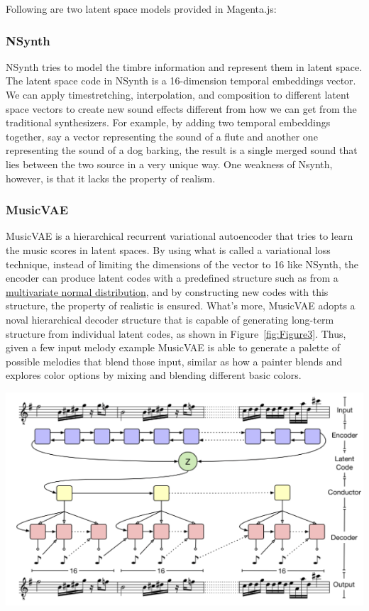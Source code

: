 \documentclass[man]{apa6}
\begin{document}
Following are two latent space models provided in Magenta.js:

\subsubsection{NSynth}
NSynth \parencite{engel2017neural} tries to model the timbre information and represent them in latent space. The latent space code in NSynth is a 16-dimension temporal embeddings vector. We can apply timestretching, interpolation, and composition to different latent space vectors to create new sound effects different from how we can get from the traditional synthesizers. For example, by adding two temporal embeddings together, say a vector representing the sound of a flute and another one representing the sound of a dog barking, the result is a single merged sound that lies between the two source in a very unique way. One weakness of Nsynth, however, is that it lacks the property of realism.

\subsubsection{MusicVAE}
MusicVAE \parencite{roberts2018hierarchical} is a hierarchical recurrent variational autoencoder that tries to learn the music scores in latent spaces. By using what is called a variational loss technique, instead of limiting the dimensions of the vector to 16 like NSynth, the encoder can produce latent codes with a predefined structure such as from a \href{https://en.wikipedia.org/wiki/Multivariate_normal_distribution}{multivariate normal distribution}, and by constructing new codes with this structure, the property of realistic is ensured. What's more, MusicVAE adopts a noval hierarchical decoder structure that is capable of generating long-term structure from individual latent codes, as shown in Figure~\ref{fig:Figure3}. Thus, given a few input melody example MusicVAE is able to generate a palette of possible melodies that blend those input, similar as how a painter blends and explores color options by mixing and blending different basic colors.

\begin{center}
  \centering
  \includegraphics[width=\linewidth]{music_vae.png}
  \label{fig:Figure3}
\end{center}
\end{document}
